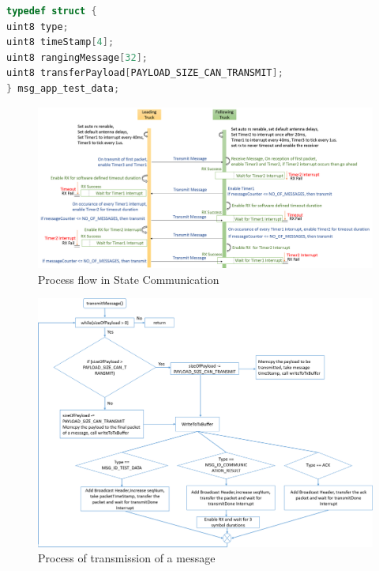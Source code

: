 \begin{lstlisting}[caption={Test data structure definition}, label={lst:testDataStructureDefinition}, language=C]
typedef struct {
uint8 type;
uint8 timeStamp[4];
uint8 rangingMessage[32];
uint8 transferPayload[PAYLOAD_SIZE_CAN_TRANSMIT];
} msg_app_test_data;
\end{lstlisting}
\begin{figure}[h!]
    \includegraphics[width=1\textwidth]{figures/StateCommunicationPhase}
    \centering
    \caption{Process flow in State Communication}
    \label{fig:stateCommunication}    
\end{figure}
\begin{figure}[h!]
	\includegraphics[width=1\textwidth]{figures/transmitMessage}
	\centering
	\caption{Process of transmission of a message}
	\label{fig:transmitMessage}    
\end{figure}
